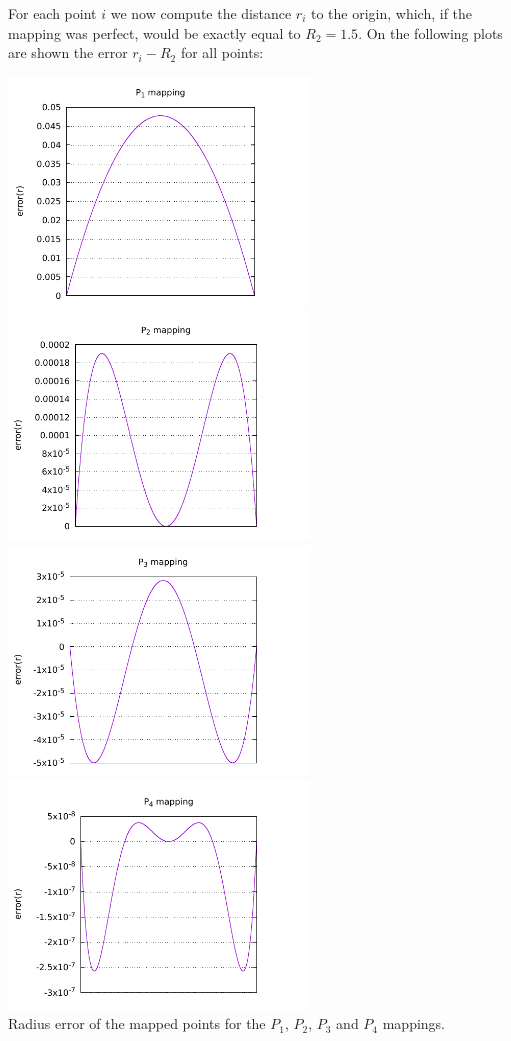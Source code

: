 For each point $i$ we now compute the distance $r_i$ 
to the origin, which, if the 
mapping was perfect, would be exactly equal to $R_2=1.5$. 
On the following plots are shown the error $r_i-R_2$ for all 
points:

\begin{center}
\includegraphics[width=8cm]{images/mappings/curved_triangles/innerline_error_P1mapping.pdf}
\includegraphics[width=8cm]{images/mappings/curved_triangles/innerline_error_P2mapping.pdf}\\
\includegraphics[width=8cm]{images/mappings/curved_triangles/innerline_error_P3mapping.pdf}
\includegraphics[width=8cm]{images/mappings/curved_triangles/innerline_error_P4mapping.pdf}\\
{\captionfont Radius error of the mapped points for the $P_1$, $P_2$, $P_3$ and $P_4$ mappings.}
\end{center}

